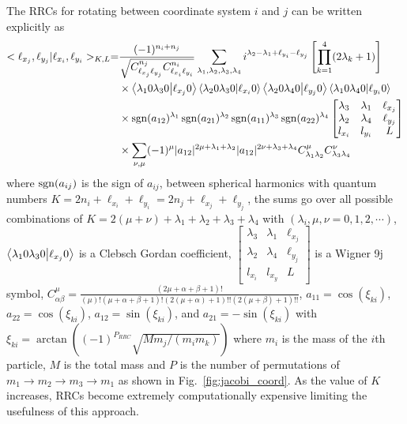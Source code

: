 The RRCs for rotating between coordinate system $i$ and $j$ can be written explicitly as
\begin{align}
\nonumber
    <\ell_{x_j},\ell_{y_j}|\ell_{x_i},\ell_{y_i}>_{K,L} =& \frac{(-1)^{n_i+n_j}}{\sqrt{C_{\ell_{x_j}\ell_{y_j}}^{n_j}C_{\ell_{x_i}\ell_{y_i}}^{n_i}}} \sum\limits_{\lambda_1,\lambda_2,\lambda_3,\lambda_4} i^{\lambda_2-\lambda_1+\ell_{y_i}-\ell_{y_j}}\left[\prod_{k=1}^4 (2\lambda_k +1)\right] \\ 
\nonumber
    & \times \braket{\lambda_1 0 \lambda_3 0}{\ell_{x_j} 0} \braket{\lambda_2 0 \lambda_3 0}{\ell_{x_i} 0} \braket{\lambda_2 0 \lambda_4 0}{\ell_{y_j} 0} \braket{\lambda_1 0 \lambda_4 0}{\ell_{y_i} 0} \\
\nonumber
    & \times \operatorname{sgn}(a_{12})^{\lambda_1}\operatorname{sgn}(a_{21})^{\lambda_2}\operatorname{sgn}(a_{11})^{\lambda_3}\operatorname{sgn}(a_{22})^{\lambda_4} \begin{bmatrix}
  \lambda_3 & \lambda_1 & \ell_{x_j} \\
  \lambda_2 & \lambda_4 & \ell_{y_j} \\
  l_{x_i}   & l_{y_i}   & L
  \end{bmatrix} \\
    & \times \sum\limits_{\nu,\mu} (-1)^{\mu}|a_{12}|^{2\mu + \lambda_1 + \lambda_2} |a_{12}|^{2\nu + \lambda_3 + \lambda_4} C_{\lambda_1 \lambda_2}^{\mu} C_{\lambda_3 \lambda_4}^{\nu}
    \label{eq:RRC}
\end{align}
where $\operatorname{sgn}(a_{ij})$ is the sign of $a_{ij}$, between spherical harmonics with quantum numbers $K=2n_i+\ell_{x_i}+\ell_{y_i}=2n_j+\ell_{x_j}+\ell_{y_j}$, the sums go over all possible combinations of $K=2(\mu+\nu)+\lambda_1+\lambda_2+\lambda_3+\lambda_4$ with $(\lambda_i, \mu, \nu = 0,1,2,\cdots)$, $\braket{\lambda_1 0 \lambda_3 0}{\ell_{x_j} 0}$ is a Clebsch Gordan coefficient,
     $\begin{bmatrix}
        \lambda_3 & \lambda_1 & \ell_{x_j} \\
        \lambda_2 & \lambda_4 & \ell_{y_j} \\
        l_{x_i}   & l_{x_y}   & L
        \end{bmatrix}$
is a Wigner 9j symbol, 
    $C_{\alpha\beta}^\mu = \frac{(2\mu+\alpha+\beta+1)!}{(\mu)!(\mu+\alpha+\beta+1)!(2(\mu+\alpha)+1)!!(2(\mu+\beta)+1)!!}$,
$a_{11} = \cos(\xi_{ki})$,
$a_{22} = \cos(\xi_{ki})$,
$a_{12} = \sin(\xi_{ki})$, and 
$a_{21} = -\sin(\xi_{ki})$
with $\xi_{ki} = \arctan((-1)^{P_{RRC}}\sqrt{Mm_j/(m_i m_k)})$ where $m_i$ is the mass of the $i$th particle, $M$ is the total mass and $P$ is the number of permutations of $m_1\rightarrow m_2\rightarrow m_3\rightarrow m_1$  as shown in Fig.~\ref{fig:jacobi_coord}. As the value of $K$ increases, RRCs become extremely computationally expensive limiting the usefulness of this approach.


